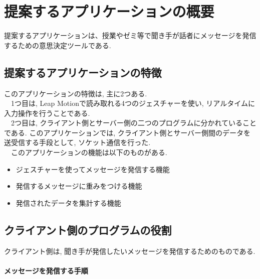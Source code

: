 \documentclass{funthesis}
\begin{document}
\chapter{提案するアプリケーションの概要}

提案するアプリケーションは、授業やゼミ等で聞き手が話者にメッセージを発信するための意思決定ツールである. 

\section{提案するアプリケーションの特徴}


このアプリケーションの特徴は, 主に2つある.\\
　1つ目は, Leap Motionで読み取れる4つのジェスチャーを使い, リアルタイムに入力操作を行うことである. \\
　2つ目は, クライアント側とサーバー側の二つのプログラムに分かれていることである. このアプリケーションでは, クライアント側とサーバー側間のデータを送受信する手段として, ソケット通信を行った. \\
　このアプリケーションの機能は以下のものがある.
\begin{itemize}
 \item ジェスチャーを使ってメッセージを発信する機能
 \item 発信するメッセージに重みをつける機能
 \item 発信されたデータを集計する機能
\end{itemize}


\section{クライアント側のプログラムの役割}
クライアント側は, 聞き手が発信したいメッセージを発信するためのものである. 

\subsubsection{メッセージを発信する手順}
\end{document}
